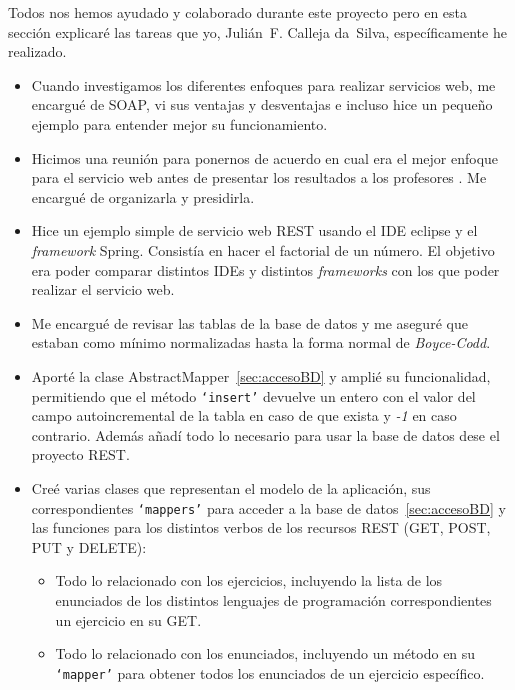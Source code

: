 
Todos nos hemos ayudado y colaborado durante este proyecto pero en esta sección explicaré las tareas que yo, Julián~F. Calleja da~Silva, específicamente he realizado.

\begin{itemize}
\item
Cuando investigamos los diferentes enfoques para realizar servicios web, me encargué de SOAP, vi sus ventajas y desventajas e incluso hice un pequeño ejemplo para entender mejor su funcionamiento.

\item
Hicimos una reunión para ponernos de acuerdo en cual era el mejor enfoque para el servicio web antes de presentar los resultados a los profesores . Me encargué de organizarla y presidirla.

\item
Hice un ejemplo simple de servicio web REST usando el IDE eclipse y el \emph{framework} Spring. Consistía en hacer el factorial de un número. El objetivo era poder comparar distintos IDEs y distintos \emph{frameworks} con los que poder realizar el servicio web.

\item
Me encargué de revisar las tablas de la base de datos y me aseguré que estaban como mínimo normalizadas hasta la forma normal de \emph{Boyce-Codd}.

\item
Aporté la clase AbstractMapper~\ref{sec:accesoBD} y amplié su funcionalidad, permitiendo que el método \texttt{`insert'} devuelve un entero con el valor del campo autoincremental de la tabla en caso de que exista y \emph{-1} en caso contrario. Además añadí todo lo necesario para usar la base de datos dese el proyecto REST.

\item
Creé varias clases que representan el modelo de la aplicación, sus correspondientes \texttt{`mappers'} para acceder a la base de datos~\ref{sec:accesoBD} y las funciones para los distintos verbos de los recursos REST (GET, POST, PUT y DELETE):

\begin{itemize}
\item
Todo lo relacionado con los ejercicios, incluyendo la lista de los enunciados de los distintos lenguajes de programación correspondientes un ejercicio en su GET.

\item
Todo lo relacionado con los enunciados, incluyendo un método en su \texttt{`mapper'} para obtener todos los enunciados de un ejercicio específico.


\end{itemize}
\end{itemize}
